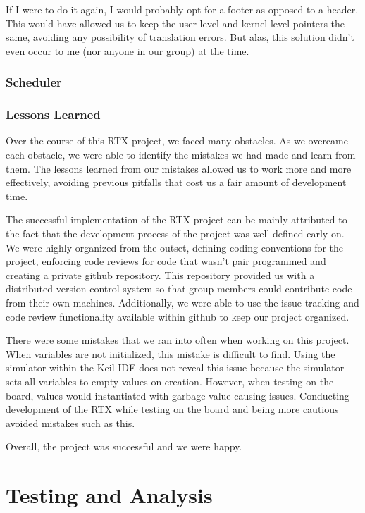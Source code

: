 \documentclass[12pt]{report}
\begin{document}
If I were to do it again, I would probably opt for a footer as opposed to a
header. This would have allowed us to keep the user-level and kernel-level
pointers the same, avoiding any possibility of translation errors. But alas,
this solution didn't even occur to me (nor anyone in our group) at the time.
\section{Scheduler}

\section{Lessons Learned}
  Over the course of this RTX project, we faced many obstacles. As we overcame each obstacle, we were able to identify the mistakes we had made and learn from them. The lessons learned from our mistakes allowed us to work more and more effectively, avoiding previous pitfalls that cost us a fair amount of development time.


The successful implementation of the RTX project can be mainly attributed to the fact that the development process of the project was well defined early on. We were highly organized from the outset, defining coding conventions for the project, enforcing code reviews for code that wasn’t pair programmed and creating a private github repository. This repository provided us with a distributed version control system so that group members could contribute code from their own machines. Additionally, we were able to use the issue tracking and code review functionality available within github to keep our project organized.

There were some mistakes that we ran into often when working on this project. When variables are not initialized, this mistake is difficult to find. Using the simulator within the Keil IDE does not reveal this issue because the simulator sets all variables to empty values on creation. However, when testing on the board, values would instantiated with garbage value causing issues. Conducting development of the RTX while testing on the board and being more cautious avoided mistakes such as this.

Overall, the project was successful and we were happy.

\part{Testing and Analysis}
\end{document}
